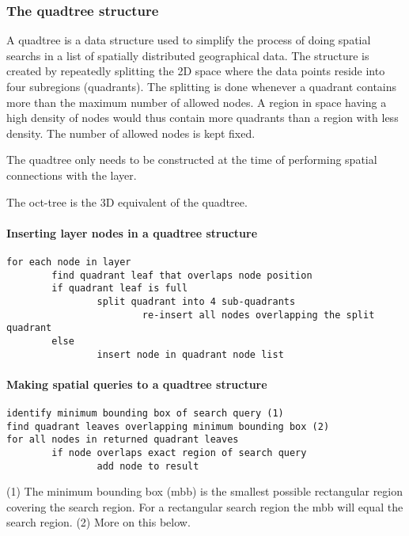 \documentclass{article}
\begin{document}
\subsubsection{The quadtree structure}

A quadtree is a data structure used to simplify the process of doing spatial searchs in a list of spatially distributed geographical data. The structure is created by repeatedly splitting the 2D space where the data points reside into four subregions (quadrants). The splitting is done whenever a quadrant contains more than the maximum number of allowed nodes. A region in space having a high density of nodes would thus contain more quadrants than a region with less density. The number of allowed nodes is kept fixed.

The quadtree only needs to be constructed at the time of performing spatial connections with the layer.

The oct-tree is the 3D equivalent of the quadtree.


\paragraph{Inserting layer nodes in a quadtree structure}
\begin{verbatim}
for each node in layer
        find quadrant leaf that overlaps node position
        if quadrant leaf is full
                split quadrant into 4 sub-quadrants
                        re-insert all nodes overlapping the split quadrant
        else
                insert node in quadrant node list	
\end{verbatim}

\paragraph{Making spatial queries to a quadtree structure}
\begin{verbatim}
identify minimum bounding box of search query (1)
find quadrant leaves overlapping minimum bounding box (2)
for all nodes in returned quadrant leaves
        if node overlaps exact region of search query
                add node to result
\end{verbatim}

(1) The minimum bounding box (mbb) is the smallest possible rectangular region covering the search region. For a rectangular search region the mbb will equal the search region.
(2) More on this below.
\end{document}
